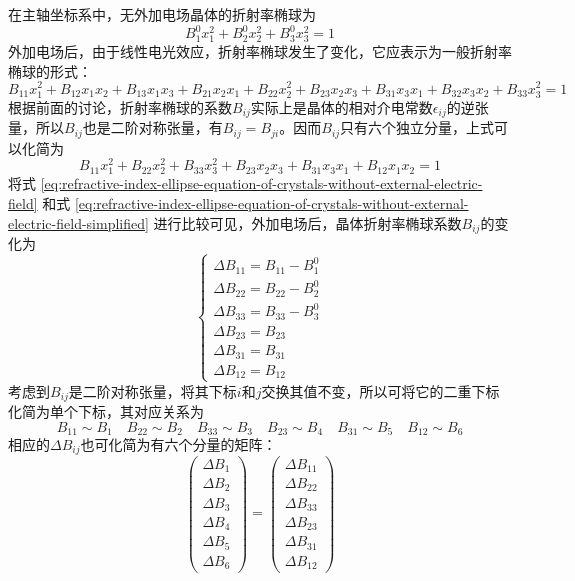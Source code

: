 \documentclass[cn,10pt,chinesefont=founder,math=mtpro2,cite=super,toc=onecol,twoside,openany]{elegantbook}
\begin{document}
在主轴坐标系中，无外加电场晶体的折射率椭球为
\begin{equation}
B^0_1x^2_1+B^0_2x^2_2+B^0_3x^2_3=1
\label{eq:refractive-index-ellipse-equation-of-crystals-without-external-electric-field}
\end{equation}
外加电场后，由于线性电光效应，折射率椭球发生了变化，它应表示为一般折射率椭球的形式：
\begin{equation}
B_{11}x^2_1+B_{12}x_1x_2+B_{13}x_1x_3+B_{21}x_2x_1+B_{22}x^2_2+B_{23}x_2x_3+B_{31}x_3x_1+B_{32}x_3x_2+B_{33}x^2_3=1
\end{equation}
根据前面的讨论，折射率椭球的系数$B_{ij}$实际上是晶体的相对介电常数$\epsilon_{ij}$的逆张量，所以$B_{ij}$也是二阶对称张量，有$B_{ij}=B_{ji}$。因而$B_{ij}$只有六个独立分量，上式可以化简为
\begin{equation}
B_{11}x^2_1+B_{22}x^2_2+B_{33}x^2_3+B_{23}x_2x_3+B_{31}x_3x_1+B_{12}x_1x_2=1
\label{eq:refractive-index-ellipse-equation-of-crystals-without-external-electric-field-simplified}
\end{equation}
将式 \eqref{eq:refractive-index-ellipse-equation-of-crystals-without-external-electric-field} 和式 \eqref{eq:refractive-index-ellipse-equation-of-crystals-without-external-electric-field-simplified} 进行比较可见，外加电场后，晶体折射率椭球系数$B_{ij}$的变化为
\begin{equation}
\begin{cases}
\Delta B_{11}=B_{11}-B^0_1\\
\Delta B_{22}=B_{22}-B^0_2\\
\Delta B_{33}=B_{33}-B^0_3\\
\Delta B_{23}=B_{23}\\
\Delta B_{31}=B_{31}\\
\Delta B_{12}=B_{12}
\end{cases}
\end{equation}
考虑到$B_{ij}$是二阶对称张量，将其下标$i$和$j$交换其值不变，所以可将它的二重下标化简为单个下标，其对应关系为
\begin{equation}
B_{11}\sim B_1\quad B_{22}\sim B_2\quad B_{33}\sim B_3\quad B_{23}\sim B_4\quad B_{31}\sim B_5\quad B_{12}\sim B_6
\end{equation}
相应的$\Delta B_{ij}$也可化简为有六个分量的矩阵：
\begin{equation}
\begin{pmatrix}
\Delta B_1\\
\Delta B_2\\
\Delta B_3\\
\Delta B_4\\
\Delta B_5\\
\Delta B_6
\end{pmatrix}=
\begin{pmatrix}
\Delta B_{11}\\
\Delta B_{22}\\
\Delta B_{33}\\
\Delta B_{23}\\
\Delta B_{31}\\
\Delta B_{12}
\end{pmatrix}
\end{equation}
\end{document}
